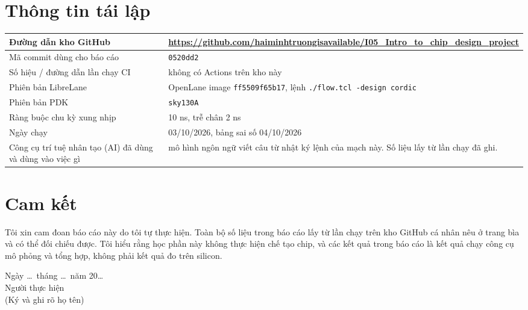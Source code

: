 \documentclass[12pt,a4paper]{article}
\begin{document}
\section{Thông tin tái lập}
\begin{tabularx}{\textwidth}{|l|Y|}
\hline
Đường dẫn kho GitHub & \url{https://github.com/haiminhtruongisavailable/I05_Intro_to_chip_design_project} \\ \hline
Mã commit dùng cho báo cáo & \texttt{0520dd2} \\ \hline
Số hiệu / đường dẫn lần chạy CI & không có Actions trên kho này \\ \hline
Phiên bản LibreLane & OpenLane image \texttt{ff5509f65b17}, lệnh \texttt{./flow.tcl -design cordic} \\ \hline
Phiên bản PDK & \texttt{sky130A} \\ \hline
Ràng buộc chu kỳ xung nhịp & 10 ns, trễ chân 2 ns \\ \hline
Ngày chạy & 03/10/2026, bảng sai số 04/10/2026 \\ \hline
Công cụ trí tuệ nhân tạo (AI) đã dùng và dùng vào việc gì & mô hình ngôn ngữ viết câu từ nhật ký lệnh của mạch này. Số liệu lấy từ lần chạy đã ghi. \\ \hline
\end{tabularx}

\section*{Cam kết}
Tôi xin cam đoan báo cáo này do tôi tự thực hiện. Toàn bộ số liệu trong báo cáo lấy từ lần chạy trên kho GitHub cá nhân nêu ở trang bìa và có thể đối chiếu được. Tôi hiểu rằng học phần này không thực hiện chế tạo chip, và các kết quả trong báo cáo là kết quả chạy công cụ mô phỏng và tổng hợp, không phải kết quả đo trên silicon.

\begin{flushleft}
Ngày \ldots\ tháng \ldots\ năm 20\ldots\\[1.2em]
Người thực hiện\\[4em]
(Ký và ghi rõ họ tên)
\end{flushleft}
\end{document}
